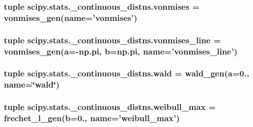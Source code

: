\subsubsection[{vonmises}]{\setlength{\rightskip}{0pt plus 5cm}tuple scipy.\+stats.\+\_\+continuous\+\_\+distns.\+vonmises = {\bf vonmises\+\_\+gen}(name='vonmises')}\label{namespacescipy_1_1stats_1_1__continuous__distns_a1f21f2410a29da813034d9602e756fd5}
\hypertarget{namespacescipy_1_1stats_1_1__continuous__distns_a8065007164ec3a24214aaee219658e85}{}
\subsubsection[{vonmises\+\_\+line}]{\setlength{\rightskip}{0pt plus 5cm}tuple scipy.\+stats.\+\_\+continuous\+\_\+distns.\+vonmises\+\_\+line = {\bf vonmises\+\_\+gen}({\bf a}=-\/np.\+pi, {\bf b}=np.\+pi, name='vonmises\+\_\+line')}\label{namespacescipy_1_1stats_1_1__continuous__distns_a8065007164ec3a24214aaee219658e85}
\hypertarget{namespacescipy_1_1stats_1_1__continuous__distns_a1f8fed0ad9e61a108edd95e01446c25d}{}
\subsubsection[{wald}]{\setlength{\rightskip}{0pt plus 5cm}tuple scipy.\+stats.\+\_\+continuous\+\_\+distns.\+wald = {\bf wald\+\_\+gen}({\bf a}=0., name=\char`\"{}wald\char`\"{})}\label{namespacescipy_1_1stats_1_1__continuous__distns_a1f8fed0ad9e61a108edd95e01446c25d}
\hypertarget{namespacescipy_1_1stats_1_1__continuous__distns_acda1b486c6a9d7ed441f77203cc865a0}{}
\subsubsection[{weibull\+\_\+max}]{\setlength{\rightskip}{0pt plus 5cm}tuple scipy.\+stats.\+\_\+continuous\+\_\+distns.\+weibull\+\_\+max = {\bf frechet\+\_\+l\+\_\+gen}({\bf b}=0., name='weibull\+\_\+max')}\label{namespacescipy_1_1stats_1_1__continuous__distns_acda1b486c6a9d7ed441f77203cc865a0}
\hypertarget{namespacescipy_1_1stats_1_1__continuous__distns_a76212d97d9fb397339dcfe7c4cf38f8f}{}
